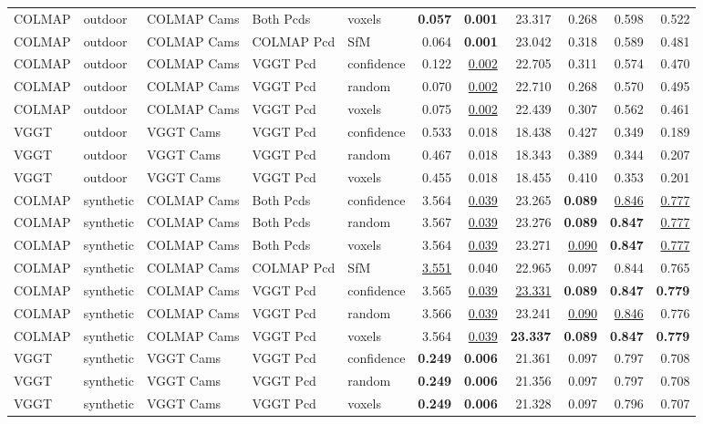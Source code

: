 \begin{table}[H]
\begin{tabular}{lllllrrrrrr}
COLMAP & outdoor & COLMAP Cams & Both Pcds & voxels & \textbf{0.057} & \textbf{0.001} & 23.317 & 0.268 & 0.598 & 0.522 \\
COLMAP & outdoor & COLMAP Cams & COLMAP Pcd & SfM & 0.064 & \textbf{0.001} & 23.042 & 0.318 & 0.589 & 0.481 \\
COLMAP & outdoor & COLMAP Cams & VGGT Pcd & confidence & 0.122 & \underline{0.002} & 22.705 & 0.311 & 0.574 & 0.470 \\
COLMAP & outdoor & COLMAP Cams & VGGT Pcd & random & 0.070 & \underline{0.002} & 22.710 & 0.268 & 0.570 & 0.495 \\
COLMAP & outdoor & COLMAP Cams & VGGT Pcd & voxels & 0.075 & \underline{0.002} & 22.439 & 0.307 & 0.562 & 0.461 \\
VGGT & outdoor & VGGT Cams & VGGT Pcd & confidence & 0.533 & 0.018 & 18.438 & 0.427 & 0.349 & 0.189 \\
VGGT & outdoor & VGGT Cams & VGGT Pcd & random & 0.467 & 0.018 & 18.343 & 0.389 & 0.344 & 0.207 \\
VGGT & outdoor & VGGT Cams & VGGT Pcd & voxels & 0.455 & 0.018 & 18.455 & 0.410 & 0.353 & 0.201 \\
\midrule
COLMAP & synthetic & COLMAP Cams & Both Pcds & confidence & 3.564 & \underline{0.039} & 23.265 & \textbf{0.089} & \underline{0.846} & \underline{0.777} \\
COLMAP & synthetic & COLMAP Cams & Both Pcds & random & 3.567 & \underline{0.039} & 23.276 & \textbf{0.089} & \textbf{0.847} & \underline{0.777} \\
COLMAP & synthetic & COLMAP Cams & Both Pcds & voxels & 3.564 & \underline{0.039} & 23.271 & \underline{0.090} & \textbf{0.847} & \underline{0.777} \\
COLMAP & synthetic & COLMAP Cams & COLMAP Pcd & SfM & \underline{3.551} & 0.040 & 22.965 & 0.097 & 0.844 & 0.765 \\
COLMAP & synthetic & COLMAP Cams & VGGT Pcd & confidence & 3.565 & \underline{0.039} & \underline{23.331} & \textbf{0.089} & \textbf{0.847} & \textbf{0.779} \\
COLMAP & synthetic & COLMAP Cams & VGGT Pcd & random & 3.566 & \underline{0.039} & 23.241 & \underline{0.090} & \underline{0.846} & 0.776 \\
COLMAP & synthetic & COLMAP Cams & VGGT Pcd & voxels & 3.564 & \underline{0.039} & \textbf{23.337} & \textbf{0.089} & \textbf{0.847} & \textbf{0.779} \\
VGGT & synthetic & VGGT Cams & VGGT Pcd & confidence & \textbf{0.249} & \textbf{0.006} & 21.361 & 0.097 & 0.797 & 0.708 \\
VGGT & synthetic & VGGT Cams & VGGT Pcd & random & \textbf{0.249} & \textbf{0.006} & 21.356 & 0.097 & 0.797 & 0.708 \\
VGGT & synthetic & VGGT Cams & VGGT Pcd & voxels & \textbf{0.249} & \textbf{0.006} & 21.328 & 0.097 & 0.796 & 0.707 \\
\bottomrule
\end{tabular}
\end{table}